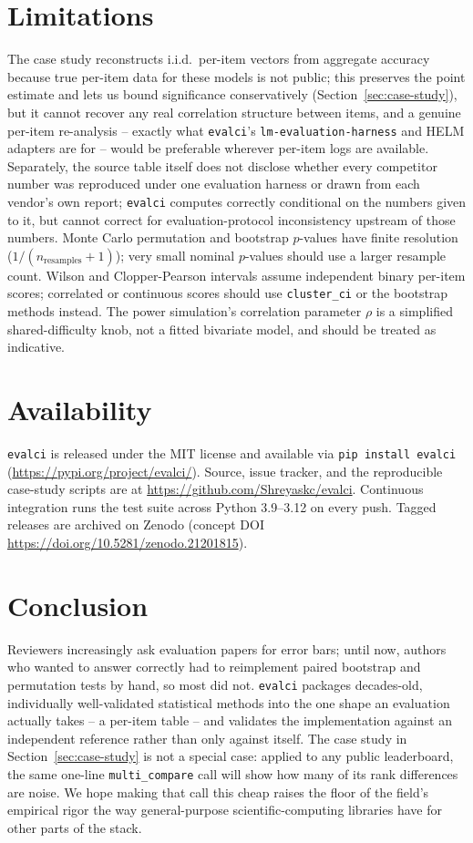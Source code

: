 \documentclass[11pt]{article}
\begin{document}
\section{Limitations}

The case study reconstructs i.i.d.\ per-item vectors from aggregate accuracy
because true per-item data for these models is not public; this preserves
the point estimate and lets us bound significance conservatively
(Section~\ref{sec:case-study}), but it cannot recover any real correlation
structure between items, and a genuine per-item re-analysis -- exactly what
\texttt{evalci}'s \texttt{lm-evaluation-harness} and HELM adapters are for --
would be preferable wherever per-item logs are available. Separately, the
source table itself does not disclose whether every competitor number was
reproduced under one evaluation harness or drawn from each vendor's own
report; \texttt{evalci} computes correctly conditional on the numbers given
to it, but cannot correct for evaluation-protocol inconsistency upstream of
those numbers. Monte Carlo permutation and bootstrap $p$-values have finite
resolution ($1/(n_{\mathrm{resamples}}+1)$); very small nominal $p$-values
should use a larger resample count. Wilson and Clopper-Pearson intervals
assume independent binary per-item scores; correlated or continuous scores
should use \texttt{cluster\_ci} or the bootstrap methods instead. The power
simulation's correlation parameter $\rho$ is a simplified shared-difficulty
knob, not a fitted bivariate model, and should be treated as indicative.

\section{Availability}

\texttt{evalci} is released under the MIT license and available via
\texttt{pip install evalci} (\url{https://pypi.org/project/evalci/}). Source,
issue tracker, and the reproducible case-study scripts are at
\url{https://github.com/Shreyaskc/evalci}. Continuous integration runs the
test suite across Python 3.9--3.12 on every push. Tagged releases are archived
on Zenodo (concept DOI \url{https://doi.org/10.5281/zenodo.21201815}).

\section{Conclusion}

Reviewers increasingly ask evaluation papers for error bars; until now,
authors who wanted to answer correctly had to reimplement paired bootstrap
and permutation tests by hand, so most did not. \texttt{evalci} packages
decades-old, individually well-validated statistical methods into the one
shape an evaluation actually takes -- a per-item table -- and validates the
implementation against an independent reference rather than only against
itself. The case study in Section~\ref{sec:case-study} is not a special case:
applied to any public leaderboard, the same one-line \texttt{multi\_compare}
call will show how many of its rank differences are noise. We hope making
that call this cheap raises the floor of the field's empirical rigor the way
general-purpose scientific-computing libraries have for other parts of the
stack.



\end{document}

